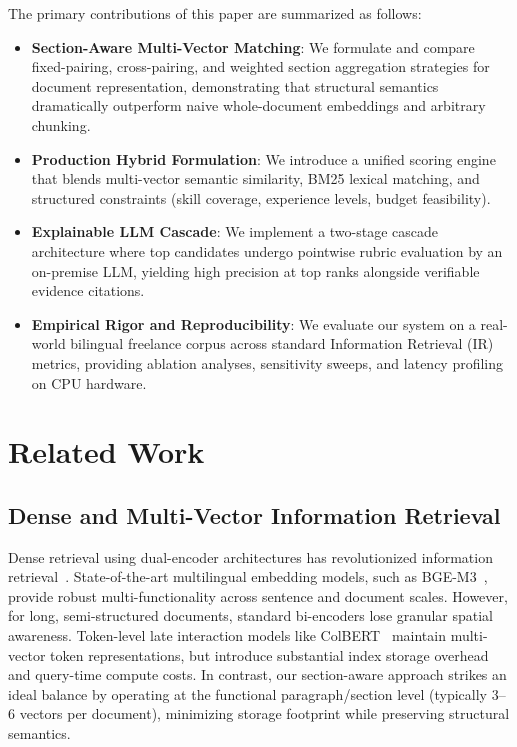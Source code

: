 \documentclass[runningheads]{llncs}
\begin{document}
The primary contributions of this paper are summarized as follows:
\begin{itemize}
    \item \textbf{Section-Aware Multi-Vector Matching}: We formulate and compare fixed-pairing, cross-pairing, and weighted section aggregation strategies for document representation, demonstrating that structural semantics dramatically outperform naive whole-document embeddings and arbitrary chunking.
    \item \textbf{Production Hybrid Formulation}: We introduce a unified scoring engine that blends multi-vector semantic similarity, BM25 lexical matching, and structured constraints (skill coverage, experience levels, budget feasibility).
    \item \textbf{Explainable LLM Cascade}: We implement a two-stage cascade architecture where top candidates undergo pointwise rubric evaluation by an on-premise LLM, yielding high precision at top ranks alongside verifiable evidence citations.
    \item \textbf{Empirical Rigor and Reproducibility}: We evaluate our system on a real-world bilingual freelance corpus across standard Information Retrieval (IR) metrics, providing ablation analyses, sensitivity sweeps, and latency profiling on CPU hardware.
\end{itemize}

\section{Related Work}

\subsection{Dense and Multi-Vector Information Retrieval}
Dense retrieval using dual-encoder architectures has revolutionized information retrieval~\cite{karpukhin2020dense}. State-of-the-art multilingual embedding models, such as BGE-M3~\cite{chen2024bge}, provide robust multi-functionality across sentence and document scales. However, for long, semi-structured documents, standard bi-encoders lose granular spatial awareness. Token-level late interaction models like ColBERT~\cite{khattab2020colbert} maintain multi-vector token representations, but introduce substantial index storage overhead and query-time compute costs. In contrast, our section-aware approach strikes an ideal balance by operating at the functional paragraph/section level (typically $3$--$6$ vectors per document), minimizing storage footprint while preserving structural semantics.
\end{document}
